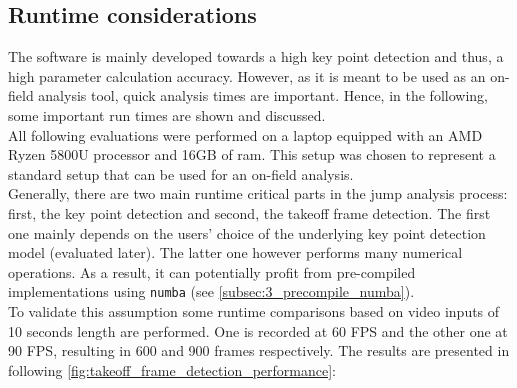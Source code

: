 \subsection{Runtime considerations}\label{subsec:4_runtime_performance}
The software is mainly developed towards a high key point detection and
thus, a high parameter calculation accuracy.
However, as it is meant to be used as an on-field analysis tool, quick
analysis times are important.
Hence, in the following, some important run times are shown and discussed.\\
All following evaluations were performed on a laptop equipped with an
AMD Ryzen 5800U processor and 16GB of ram.
This setup was chosen to represent a standard setup that can be used for an
on-field analysis.\\
Generally, there are two main runtime critical parts in the jump analysis
process: first, the key point detection and second, the takeoff frame
detection.
The first one mainly depends on the users' choice of the underlying key point
detection model (evaluated later).
The latter one however performs many numerical operations.
As a result, it can potentially profit from pre-compiled implementations
using \texttt{numba} (see \autoref{subsec:3_precompile_numba}).\\
To validate this assumption some runtime comparisons based on video inputs of
10 seconds length are performed.
One is recorded at 60 \ac{FPS} and the other one at 90 \ac{FPS},
resulting in 600 and 900 frames respectively.
The results are presented in following
\autoref*{fig:takeoff_frame_detection_performance}:
